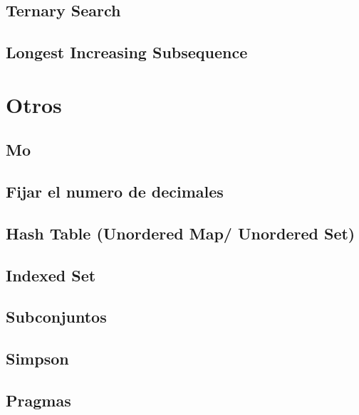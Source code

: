 \documentclass[a4paper,11pt,landscape,twocolumn]{article}
\begin{document}
\subsection{Ternary Search}

\subsection{Longest Increasing Subsequence}


\section{Otros} %
\subsection{Mo}

\subsection{Fijar el numero de decimales}

\subsection{Hash Table (Unordered Map/ Unordered Set)}

\subsection{Indexed Set}

\subsection{Subconjuntos}

\subsection{Simpson}

\subsection{Pragmas}

\end{document}
